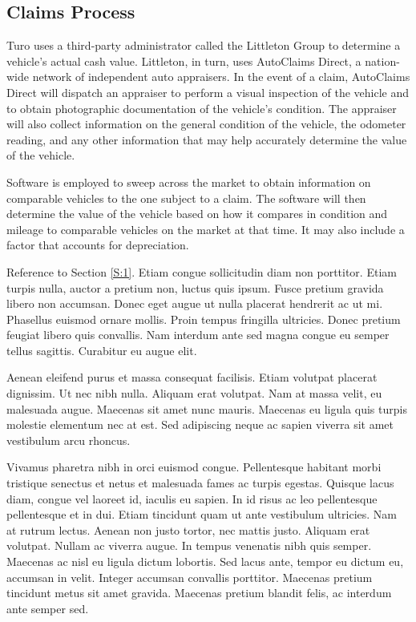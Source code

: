 \documentclass[preprint,12pt]{elsarticle}
\begin{document}
\subsection{Claims Process}\label{claims-process}
Turo uses a third-party administrator called the Littleton Group to determine a vehicle's actual cash value. Littleton, in turn, uses AutoClaims Direct, a nation-wide network of independent auto appraisers. In the event of a claim, AutoClaims Direct will dispatch an appraiser to perform a visual inspection of the vehicle and to obtain photographic documentation of the vehicle's condition. The appraiser will also collect information on the general condition of the vehicle, the odometer reading, and any other information that may help accurately determine the value of the vehicle.

Software is employed to sweep across the market to obtain information on comparable vehicles to the one subject to a claim. The software will then determine the value of the vehicle based on how it compares in condition and mileage to comparable vehicles on the market at that time. It may also include a factor that accounts for depreciation.

Reference to Section \ref{S:1}. Etiam congue sollicitudin diam non porttitor. Etiam turpis nulla, auctor a pretium non, luctus quis ipsum. Fusce pretium gravida libero non accumsan. Donec eget augue ut nulla placerat hendrerit ac ut mi. Phasellus euismod ornare mollis. Proin tempus fringilla ultricies. Donec pretium feugiat libero quis convallis. Nam interdum ante sed magna congue eu semper tellus sagittis. Curabitur eu augue elit.

Aenean eleifend purus et massa consequat facilisis. Etiam volutpat placerat dignissim. Ut nec nibh nulla. Aliquam erat volutpat. Nam at massa velit, eu malesuada augue. Maecenas sit amet nunc mauris. Maecenas eu ligula quis turpis molestie elementum nec at est. Sed adipiscing neque ac sapien viverra sit amet vestibulum arcu rhoncus.

Vivamus pharetra nibh in orci euismod congue. Pellentesque habitant morbi tristique senectus et netus et malesuada fames ac turpis egestas. Quisque lacus diam, congue vel laoreet id, iaculis eu sapien. In id risus ac leo pellentesque pellentesque et in dui. Etiam tincidunt quam ut ante vestibulum ultricies. Nam at rutrum lectus. Aenean non justo tortor, nec mattis justo. Aliquam erat volutpat. Nullam ac viverra augue. In tempus venenatis nibh quis semper. Maecenas ac nisl eu ligula dictum lobortis. Sed lacus ante, tempor eu dictum eu, accumsan in velit. Integer accumsan convallis porttitor. Maecenas pretium tincidunt metus sit amet gravida. Maecenas pretium blandit felis, ac interdum ante semper sed.
\end{document}

